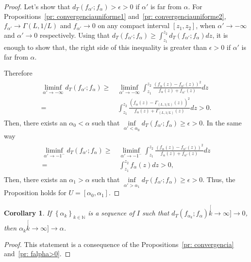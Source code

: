 \documentclass[journal]{IEEEtran}
\numberwithin{equation}{section}
\newtheorem{corollary}{Corollary}[section]
\newenvironment{dem}[1][Proof]{\begin{proof}[{\it #1}]}{\end{proof}}
\newcommand{\al}{&\,}
\newcommand{\N}{\ensuremath{\mathbb{N}}}
\newcommand{\pa}[1]{\ensuremath{\left( #1 \right)}}
\newcommand{\set}[1]{\ensuremath{\left\{ #1 \right\}}}
\begin{document}
\begin{dem}
	Let's show that $d_{T}\pa{f_{\alpha'};f_{\alpha}}>\epsilon>0$ if $\alpha'$ is far from $\alpha$. For Propositions~\ref{pr: convergenciauniforme1} and~\ref{pr: convergenciauniforme2}, $f_{\alpha'} \to \Gamma(L,1/L)$ and $f_{\alpha'} \to 0$ on any compact interval $[z_1,z_2]$, when $\alpha' \to -\infty$ and $\alpha' \to 0$ respectively.
	Using that $d_{T}\pa{f_{\alpha'};f_{\alpha}} \ge \int_{z_{1}}^{z_{2}}d_{T}\pa{f_{\alpha'};f_{\alpha}}dz$, it is enough to show that, the right side of this inequality is greater than $\epsilon>0$ if $\alpha'$ is far from $\alpha$.
	
	Therefore
	\begin{align*}
	\begin{split}
	\liminf_{\alpha'\to-\infty} d_{T}\pa{f_{\alpha'};f_{\alpha}} 
	\ge \al \liminf_{\alpha'\to-\infty}\int_{z_{1}}^{z_{2}}\frac{\pa{f_{\alpha}\pa{z}-f_{\alpha'}\pa{z}}^{2}}
	{f_{\alpha}\pa{z}+f_{\alpha'}\pa{z}}dz \\
	= \al \int_{z_{1}}^{z_{2}}\frac{\pa{f_{\alpha}\pa{z}-\Gamma_{(L,1/L)}\pa{z}}^{2}}
	{f_{\alpha}\pa{z}+\Gamma_{(L,1/L)}\pa{z}}dz >0.
	\end{split}
	\end{align*}
	Then, there exists an $\alpha_0 < \alpha$ such that $\inf\limits_{\alpha'<\alpha_0} d_{T}\pa{f_{\alpha'};f_{\alpha}} \ge \epsilon>0.$ 
	In the same way
	\begin{align*}
	\begin{split}
	\liminf_{\alpha'\to-1^{-}} d_{T}\pa{f_{\alpha'};f_{\alpha}} 
	\ge \al \liminf_{\alpha'\to-1^{-}}\int_{z_{1}}^{z_{2}}\frac{\pa{f_{\alpha}\pa{z}-f_{\alpha'}\pa{z}}^{2}}
	{f_{\alpha}\pa{z}+f_{\alpha'}\pa{z}}dz \\
	= \al \int_{z_{1}}^{z_{2}}f_{\alpha}\pa{z}dz >0,
	\end{split}
	\end{align*}
	Then, there exists an $\alpha_1>\alpha$ such that $\inf\limits_{\alpha'>\alpha_1} d_{T}\pa{f_{\alpha'};f_{\alpha}} \ge \epsilon>0.$ 
	Thus, the Proposition holds for $U=[\alpha_0,\alpha_1].$
\end{dem}

\begin{corollary}
	If $\set{\alpha_{k}}_{k\in\N}$ is a sequence of $I$ such that $d_{T}\pa{f_{\alpha_{k}};f_{\alpha}}\stackrel[k\to\infty]{}{\longrightarrow}  0$,
	then $\alpha_{k}\stackrel[k\to\infty]{}{\longrightarrow} \alpha$.
	\label{corfinal}
\end{corollary}
\begin{dem}
	This statement is a consequence of the Propositions~\ref{pr: convergencia} and~\ref{pr: falpha>0}.
\end{dem}
\end{document}
